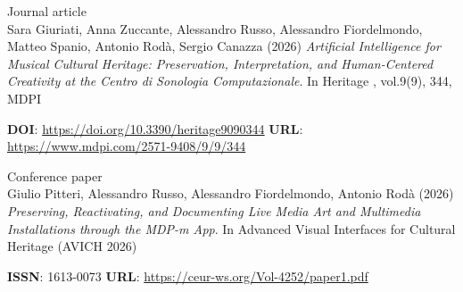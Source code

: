 \documentclass[7pt,a4paper]{article}
\begin{document}
\begin{mdframed}[
    backgroundcolor=entrygray,
    linecolor=entrygray,
    linewidth=0pt,
    innerleftmargin=6pt,
    innerrightmargin=6pt,
    innertopmargin=6pt,
    innerbottommargin=6pt,
    skipabove=0pt,
    skipbelow=0pt
]

\scriptsize Journal article\\
\normalsize Sara Giuriati, Anna Zuccante, Alessandro Russo, Alessandro Fiordelmondo, Matteo Spanio, Antonio Rodà, Sergio Canazza
(2026) \textit{Artificial Intelligence for Musical Cultural Heritage: Preservation, Interpretation, and Human-Centered Creativity at the Centro di Sonologia Computazionale}.
In
 Heritage
, vol.9(9), 344, MDPI

\vspace{0.1cm}
\scriptsize  \textbf{DOI}: \href{https://doi.org/10.3390/heritage9090344}{https://doi.org/10.3390/heritage9090344}
\scriptsize 
\scriptsize 
\scriptsize  \textbf{URL}: \href{https://www.mdpi.com/2571-9408/9/9/344}{https://www.mdpi.com/2571-9408/9/9/344}
\vspace{0.15cm}
\end{mdframed}




\begin{mdframed}[
    backgroundcolor=white,
    linecolor=white,
    linewidth=0pt,
    innerleftmargin=6pt,
    innerrightmargin=6pt,
    innertopmargin=6pt,
    innerbottommargin=6pt,
    skipabove=0pt,
    skipbelow=0pt
]

\scriptsize Conference paper\\
\normalsize Giulio Pitteri, Alessandro Russo, Alessandro Fiordelmondo, Antonio Rodà
(2026) \textit{Preserving, Reactivating, and Documenting Live Media Art and Multimedia Installations through the MDP-m App}.
In
Advanced Visual Interfaces for Cultural Heritage (AVICH 2026)

\vspace{0.1cm}
\scriptsize 
\scriptsize 
\scriptsize  \textbf{ISSN}: 1613-0073 
\scriptsize  \textbf{URL}: \href{https://ceur-ws.org/Vol-4252/paper1.pdf}{https://ceur-ws.org/Vol-4252/paper1.pdf}
\vspace{0.15cm}
\end{mdframed}
\end{document}

